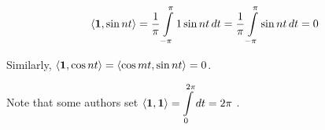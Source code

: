 \documentclass{article}
\theoremstyle{definition}
\begin{document}
\begin{equation*}
  \langle {\bf 1},\sin nt \rangle = {\displaystyle
  \dfrac{1}{\pi}\int\limits_{-\pi}^{\pi} 1 \sin nt \, dt} =
  {\displaystyle \dfrac{1}{\pi}\int\limits_{-\pi}^{\pi} \sin nt
  \, dt}  = 0
\end{equation*} 
  
\smallskip
\noindent
Similarly, $\langle {\bf 1},\cos nt \rangle = \langle \cos mt,\sin nt
\rangle = 0$.


\bigskip
\noindent
Note that some authors set ${\displaystyle \langle {\bf 1},
{\bf 1} \rangle = \int\limits_{0}^{2\pi} dt = 2 \pi}$
\cite{quora:fourier_basis_functions}.
 


%
%
%
%
%
%
%
%
%
\end{document}
